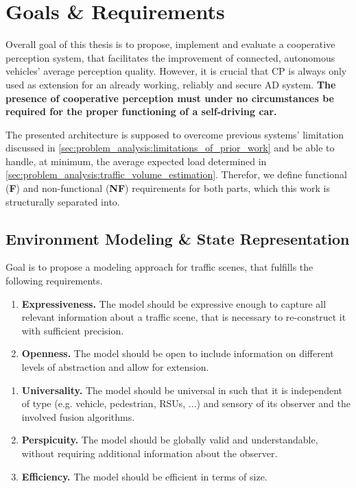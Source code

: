 \section{Goals \& Requirements}
\label{sec:problem_analysis:goals_requirements}
Overall goal of this thesis is to propose, implement and evaluate a cooperative perception system, that facilitates the improvement of connected, autonomous vehicles' average perception quality. However, it is crucial that CP is always only used as extension for an already working, reliably and secure AD system. \textbf{The presence of cooperative perception must under no circumstances be required for the proper functioning of a self-driving car.}

The presented architecture is supposed to overcome previous systems' limitation discussed in \cref{sec:problem_analysis:limitations_of_prior_work} and be able to handle, at minimum, the average expected load determined in \cref{sec:problem_analysis:traffic_volume_estimation}. Therefor, we define functional (\textbf{F}) and non-functional (\textbf{NF}) requirements for both parts, which this work is structurally separated into.

\subsection{Environment Modeling \& State Representation}
\label{subsec:problem_analysis:environment_modeling_state_representation}

Goal is to propose a modeling approach for traffic scenes, that fulfills the following requirements. 

\begin{enumerate}[F-M1:\ \ ]
	\item \textbf{Expressiveness.} The model should be expressive enough to capture all relevant information about a traffic scene, that is necessary to re-construct it with sufficient precision.
	\item \textbf{Openness.} The model should be open to include information on different levels of abstraction and allow for extension.
\end{enumerate}
\begin{enumerate}[NF-M1:]
	\item \textbf{Universality.} The model should be universal in such that it is independent of type (e.g. vehicle, pedestrian, RSUs, ...) and sensory of its observer and the involved fusion algorithms.
	\item \textbf{Perspicuity.} The model should be globally valid and understandable, without requiring additional information about the observer.
	\item \textbf{Efficiency.} The model should be efficient in terms of size.
\end{enumerate}

